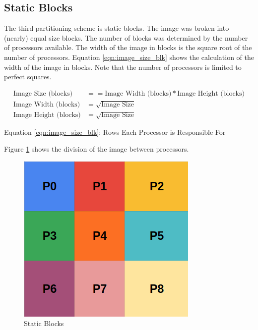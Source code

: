 \documentclass[11pt]{article}
\begin{document}
	\subsection{Static Blocks}
	
		The third partitioning scheme is static blocks. The image was broken into (nearly) equal size blocks. The number of blocks was determined by the number of processors available. The width of the image in blocks is the square root of the number of processors. Equation \ref{eqn:image_size_blk} shows the calculation of the width of the image in blocks. Note that the number of processors is limited to perfect squares.
		
		\begin{subequations}
		\begin{align}\label{eqn:image_size_blk}
			\text{Image Size (blocks)} & == \text{Image Width (blocks)} * \text{Image Height (blocks)}
			\\
			\text{Image Width (blocks)} & = \sqrt{\text{Image Size}}
			\\
			\text{Image Height (blocks)} & = \sqrt{\text{Image Size}}
		\end{align}
		\end{subequations}
		\begin{center}
			Equation \ref{eqn:image_size_blk}: Rows Each Processor is Responsible For
		\end{center}
	
		Figure \ref{fig:blocks} shows the division of the image between processors.
		
		\begin{figure}[H]
			\centering
			\includegraphics[width=0.7\linewidth]{Pictures/Blocks}
			\caption{Static Blocks}
			\label{fig:blocks}
		\end{figure}
	
\end{document}
